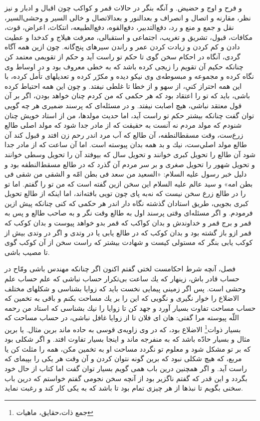و فرح و اوج و حضيض. و آنگه بنگر در حالات قمر و كواكب چون اقبال و ادبار و نيز نظر، مقارنه و اتصال و انصراف و بعد‌النور و بعد‌الاتصال و خالى السير و وحشى‌السير، نقل و جمع و منع و رد، دفع‌التدبير، دفع‌القوه، دفع‌الطبيعه، انتكاث، اعراض، قوت، مكافات، قبول، تشريق و تغريب، اجتماعى و استقبالى، معرفت هيلاج و كدخدا و عطيت دادن و كم كردن و زيادت كردن عمر و راندن سيرهاى پنج‌گانه. چون ازين همه آگاه گردى، آنگاه در احكام سخن گوى تا حكم تو راست آيد و حكم از تقويمى معتمد كن چنانكه حكيم آن تقويم را زيجى كرده باشد كه به خطى معروف بود و در اوساط وى نگاه كرده و مجموعه و مبسوطه‌ی وى نيكو ديده و مكرّر كرده و تعديلهاى تأمل كرده، با اين همه احتراز كنىِ، از سهو و از خطا تا غلطى نيفتد. و چون اين همه احتياط كرده باشى، بايد كه تو را اعتقاد بود كه هر حكمى كه من كردم چنان خواهد بودن، اگر بر آن قول معتقد نباشى، هيچ اصابت نيفتد. و در مسئله‌اى كه پرسند ضميرى هر چه گويى توان گفت چنانكه بيشتر حكم تو راست آيد، اما حديث مولدها، من از استاد خويش چنان شنودم كه مولد مردم نه آنست به حقيقت كه از مادر جدا شود كه مولد اصلى طالع زرع‌ست، وقت مسقطالنطفه، آن طالع كه آب مرد اندر رحم زن افتد و قبول كند آن طالع مولد اصلي‌ست، نيك و بد همه بدان پيوسته است. اما آن ساعت كه از مادر جدا شود آن طالع را تحويل كبرى خوانند و تحويل سال كه بيوفتد آن را تحويل وسطى خوانند و تحويل شهور را تحويل صغرى و بر سر مردم آن گذرد كه در طالع مسقط‌النطفه بود و دليل خبر رسول عليه السلام: «السعيد من سعد فى بطن امّه و الشقى من شقى فى بطن امه» و سيد عالم عليه السلام اين سخن ازين گفته است كه من تو را گفتم. اما تو را در طالع زرع سخن نيست كه نه‌به پاى چون تويى بافته‌اند، اما اينكه از طالع تحويل كبرى بجويى، طريق استادان گذشته نگاه دار اندر هر حكمى كه كنى چنانكه پيش ازين فرمودم. و اگر مسئله‌اى وقتى پرسند اول به طالع وقت نگر و به صاحب طالع و پس به قمر و برج قمر و خداوندش و بدان كواكب كه قمر بدو خواهد پيوست و بدان كوكب كه قمر ازو باز گشته بود و بدان كوكب كه در طالع يابى يا در وتدى و اگر در وتدى بيش از كوكب يابى بنگر كه مستولى كيست و شهادت بيشتر كه راست سخن از آن كوكب گوى تا مصيب باشى.

فصل، آنچه شرط احكامست لختى گفتم اكنون اگر چنانكه مهندس باشى ومّاح در حساب قادر باش، زينهار كه يك ساعت بى‌تكرار حساب نباشى كه علم حساب علم وحشى است. پس اگر زمينى پيمايى نخست بايد كه زوايا بشناسى و شكلهاى مختلف الاضلاع را خوار نگيرى و نگويى كه اين را بر يك مساحت بكنم و باقى به تخمين كه حساب مساحت تفاوت بسيار آورد و جهد كن تا زوايا را نيك بشناسى كه استاد من رحمه اللّه پيوسته مرا گفتى: هان اى فلان تا از زوايا غافل نباشى، در حساب مساحت كه بسيار ذوات\footnote{جمع ذات،‌حقایق،‌ ماهیات} الاضلاع بود، كه در وى زاويه‌ی قوسى به حاده ماند برين مثال. يا برين مثال و بسيار حادّه باشد كه به منفرجه ماند و اينجا بسيار تفاوت افتد. و اگر شكلى بود كه بر تو مشكل شود و معلوم تو نگردد مساحت او به تخمين مكن، همه را مثلث كن يا مربع، كه هيچ شكلى نبود كه برين گونه نتوان كردن و آن وقت هر يكى را بپيماى كه راست آيد. و اگر همچنين درين باب همى گويم بسيار توان گفت اما كتاب از حال خود بگردد و اين قدر كه گفتم ناگزير بود از آنچه سخن نجومى گفتم خواستم كه درين باب سخنى بگويم تا نبذها از هر چيزى تمام بود تا باشد كه به يكى كار كند و رغبت نمايد.

\newpage
